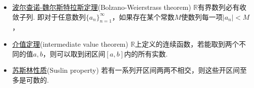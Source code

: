 \begin{itemize}
    \item \underline{波尔查诺-魏尔斯特拉斯定理}(Bolzano-Weierstrass theorem) \newline
    \(\mathbb{R}\)有界数列必有收敛子列. 即对于任意数列\(\{a_n\}_{n=1}^{\infty}\)，如果存在某个常数\(M\)使数列每一项\(|a_n|<M\)，

    \item \underline{介值定理}(intermediate value theorem) \newline
    \(\mathbb{R}\)上定义的连续函数，若能取到两个不同的值\(a,b\)，则可以取到闭区间\([a,b]\)内的所有实数.

    \item \underline{苏斯林性质}(Suslin property) \newline
    若有一系列开区间两两不相交，则这些开区间至多是可数的.

\end{itemize}




